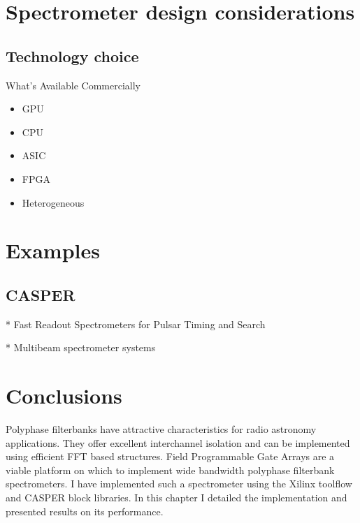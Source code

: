 \documentclass{ws-rv961x669}
\begin{document}
\section{Spectrometer design considerations}

\subsection{Technology choice}
What's Available Commercially

\begin{itemize}
	\item GPU
    \item CPU
    \item ASIC
    \item FPGA
    \item Heterogeneous	
\end{itemize}


\section{Examples}

\subsection{CASPER}

* Fast Readout Spectrometers for Pulsar Timing and Search

* Multibeam spectrometer systems

\section{Conclusions}

Polyphase filterbanks have attractive characteristics for radio astronomy
applications. They offer excellent interchannel isolation and can
be implemented using efficient FFT based structures. Field Programmable
Gate Arrays are a viable platform on which to implement wide bandwidth
polyphase filterbank spectrometers. I have implemented such a spectrometer
using the Xilinx toolflow and CASPER block libraries. In this chapter
I detailed the implementation and presented results on its performance.




\end{document}
